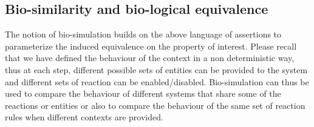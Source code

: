\subsection{Bio-similarity and bio-logical equivalence}

The notion of bio-simulation builds on the above language of assertions to parameterize the induced equivalence on the property of interest. 
Please recall that we have defined the behaviour of the context in a non deterministic way, thus 
at each step, different possible sets of entities can be provided to the system and different sets of reaction can be enabled/disabled. 
Bio-simulation can thus be used to compare the behaviour of different systems that share some of the reactions or entities or also to compare the behaviour of the same set of reaction rules when different contexts are provided.



